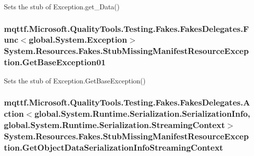 Sets the stub of Exception.\-get\-\_\-\-Data()

\hypertarget{class_system_1_1_resources_1_1_fakes_1_1_stub_missing_manifest_resource_exception_ad6e77cf84547acfc2444941ec964c2b3}{
\subsubsection[{Get\-Base\-Exception01}]{\setlength{\rightskip}{0pt plus 5cm}mqttf.\-Microsoft.\-Quality\-Tools.\-Testing.\-Fakes.\-Fakes\-Delegates.\-Func$<$global.\-System.\-Exception$>$ System.\-Resources.\-Fakes.\-Stub\-Missing\-Manifest\-Resource\-Exception.\-Get\-Base\-Exception01}}\label{class_system_1_1_resources_1_1_fakes_1_1_stub_missing_manifest_resource_exception_ad6e77cf84547acfc2444941ec964c2b3}


Sets the stub of Exception.\-Get\-Base\-Exception()

\hypertarget{class_system_1_1_resources_1_1_fakes_1_1_stub_missing_manifest_resource_exception_af2e2472dc2601ad76bfec40ac5f79c4c}{
\subsubsection[{Get\-Object\-Data\-Serialization\-Info\-Streaming\-Context}]{\setlength{\rightskip}{0pt plus 5cm}mqttf.\-Microsoft.\-Quality\-Tools.\-Testing.\-Fakes.\-Fakes\-Delegates.\-Action$<$global.\-System.\-Runtime.\-Serialization.\-Serialization\-Info, global.\-System.\-Runtime.\-Serialization.\-Streaming\-Context$>$ System.\-Resources.\-Fakes.\-Stub\-Missing\-Manifest\-Resource\-Exception.\-Get\-Object\-Data\-Serialization\-Info\-Streaming\-Context}}\label{class_system_1_1_resources_1_1_fakes_1_1_stub_missing_manifest_resource_exception_af2e2472dc2601ad76bfec40ac5f79c4c}


